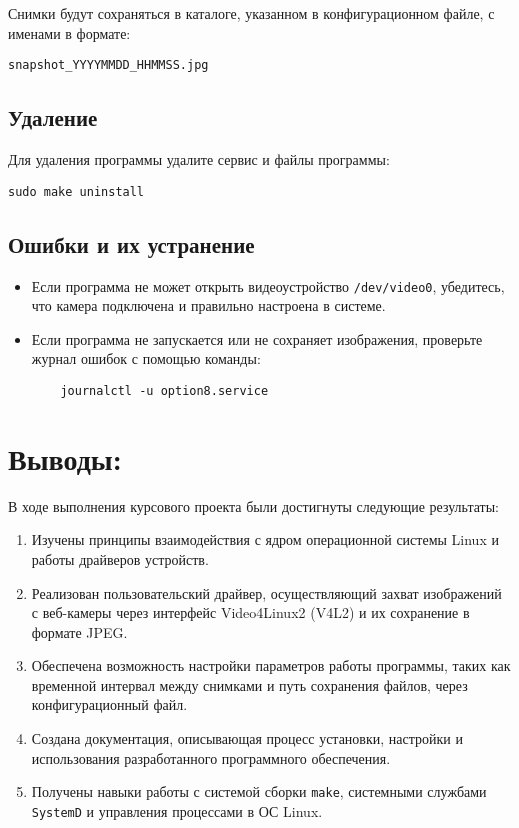 \documentclass[12pt]{article}
\begin{document}
Снимки будут сохраняться в каталоге, указанном в конфигурационном файле, с именами в формате:
\begin{verbatim}
snapshot_YYYYMMDD_HHMMSS.jpg
\end{verbatim}

\subsection*{Удаление}

Для удаления программы удалите сервис и файлы программы:
\begin{verbatim}
sudo make uninstall
\end{verbatim}

\subsection*{Ошибки и их устранение}

\begin{itemize}
    \item Если программа не может открыть видеоустройство \texttt{/dev/video0}, убедитесь, что камера подключена и правильно настроена в системе.
    \item Если программа не запускается или не сохраняет изображения, проверьте журнал ошибок с помощью команды:
    \begin{verbatim}
    journalctl -u option8.service
    \end{verbatim}
\end{itemize}

\section*{Выводы:}

В ходе выполнения курсового проекта были достигнуты следующие результаты:

\begin{enumerate}
    \item Изучены принципы взаимодействия с ядром операционной системы Linux и работы драйверов устройств.
    \item Реализован пользовательский драйвер, осуществляющий захват изображений с веб-камеры через интерфейс Video4Linux2 (V4L2) и их сохранение в формате JPEG.
    \item Обеспечена возможность настройки параметров работы программы, таких как временной интервал между снимками и путь сохранения файлов, через конфигурационный файл.
    \item Создана документация, описывающая процесс установки, настройки и использования разработанного программного обеспечения.
    \item Получены навыки работы с системой сборки \texttt{make}, системными службами \texttt{SystemD} и управления процессами в ОС Linux.
\end{enumerate}
\end{document}
